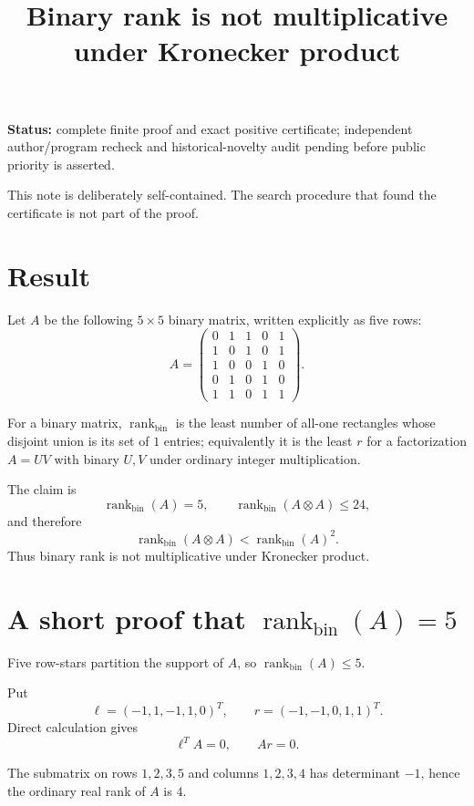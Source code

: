 \documentclass[11pt]{article}
\title{\textbf{Binary rank is not multiplicative under Kronecker product}}
\author{}
\date{}
\newcommand{\rankbin}{\operatorname{rank}_{\mathrm{bin}}}
\begin{document}
\maketitle
\vspace{-2.2em}

{\small\color{statusgray}\textbf{Status:} complete finite proof and exact positive certificate; independent author/program recheck and historical-novelty audit pending before public priority is asserted.}

This note is deliberately self-contained. The search procedure that found the certificate is not part of the proof.

\section*{Result}

Let $A$ be the following $5\times5$ binary matrix, written explicitly as five rows:
\[
A=
\begin{pmatrix}
0&1&1&0&1\\
1&0&1&0&1\\
1&0&0&1&0\\
0&1&0&1&0\\
1&1&0&1&1
\end{pmatrix}.
\]

For a binary matrix, $\rankbin$ is the least number of all-one rectangles whose disjoint union is its set of $1$ entries; equivalently it is the least $r$ for a factorization $A=UV$ with binary $U,V$ under ordinary integer multiplication.

The claim is
\[
\rankbin(A)=5,
\qquad
\rankbin(A\otimes A)\le 24,
\]
and therefore
\[
\boxed{\rankbin(A\otimes A)<\rankbin(A)^2}.
\]
Thus binary rank is not multiplicative under Kronecker product.

\section*{A short proof that $\rankbin(A)=5$}

Five row-stars partition the support of $A$, so $\rankbin(A)\le 5$.

Put
\[
\ell=(-1,1,-1,1,0)^T,
\qquad
r=(-1,-1,0,1,1)^T.
\]
Direct calculation gives
\[
\ell^T A=0,
\qquad
Ar=0.
\]

The submatrix on rows $1,2,3,5$ and columns $1,2,3,4$ has determinant $-1$, hence the ordinary real rank of $A$ is $4$.
\end{document}
